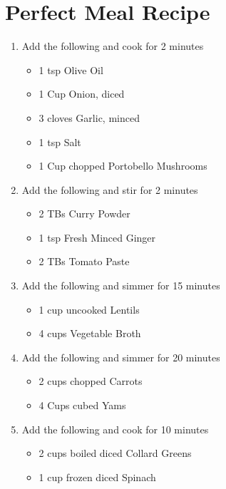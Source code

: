 \documentclass[a4paper,12pt]{book}
\begin{document}
 
 
 
 
 
 
 
 
 
 
 
\section{Perfect Meal Recipe}
 
 
 
\begin{enumerate}[label=\Roman*, font=\bfseries]
	\item Add the following and cook for 2 minutes
	\begin{itemize}
		\item 1 tsp Olive Oil
		\item 1 Cup Onion, diced
		\item 3 cloves Garlic, minced
		\item 1 tsp Salt
		\item 1 Cup chopped Portobello Mushrooms
	\end{itemize}
	\item Add the following and stir for 2 minutes
	\begin{itemize}
		\item 2 TBs Curry Powder
		\item 1 tsp Fresh Minced Ginger
		\item 2 TBs Tomato Paste
	\end{itemize}
	\item Add the following and simmer for 15 minutes
	\begin{itemize}
		\item 1 cup uncooked Lentils
		\item 4 cups Vegetable Broth
	\end{itemize}
	\item Add the following and simmer for 20 minutes
	\begin{itemize}
		\item 2 cups chopped Carrots
		\item 4 Cups cubed Yams
	\end{itemize}
	\item Add the following and cook for 10 minutes
	\begin{itemize}
		\item 2 cups boiled diced Collard Greens
		\item 1 cup frozen diced Spinach
	\end{itemize}
\end{enumerate}
 
\end{document}
